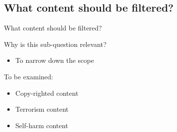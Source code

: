     \subsection{What content should be filtered?}
    \begin{frame} {What content should be filtered?}
 
        \begin{block}{Why is this sub-question relevant?}
        \begin{itemize}
            \item To narrow down the scope
        \end{itemize}
        \end{block}
        \begin{block} {To be examined:}
        \begin{itemize}
          \item Copy-righted content 
          \item Terrorism content    
          \item Self-harm content   

           \end{itemize}
        \end{block}
    \end{frame}
  
